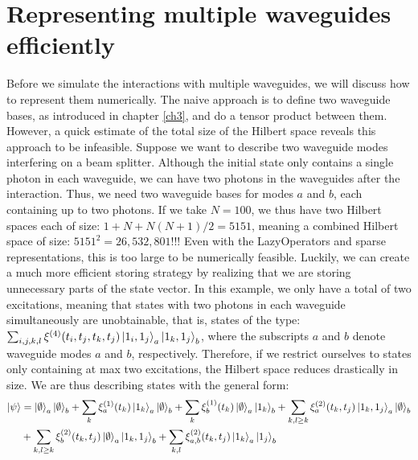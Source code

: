 \section{Representing multiple waveguides efficiently }

Before we simulate the interactions with multiple waveguides, we will discuss how to represent them numerically. The naive approach is to define two waveguide bases, as introduced in chapter \ref{ch3}, and do a tensor product between them. However, a quick estimate of the total size of the Hilbert space reveals this approach to be infeasible. Suppose we want to describe two waveguide modes interfering on a beam splitter. Although the initial state only contains a single photon in each waveguide, we can have two photons in the waveguides after the interaction. Thus, we need two waveguide bases for modes $a$ and $b$, each containing up to two photons. If we take $N=100$, we thus have two Hilbert spaces each of size: $1+N+N(N+1)/2 = 5151$, meaning a combined Hilbert space of size: $5151^2 = 26,532,801$!!! Even with the LazyOperators and sparse representations, this is too large to be numerically feasible. Luckily, we can create a much more efficient storing strategy by realizing that we are storing unnecessary parts of the state vector. In this example, we only have a total of two excitations, meaning that states with two photons in each waveguide simultaneously are unobtainable, that is, states of the type: $\sum_{i,j,k,l}\xi^{(4)}(t_i,t_j,t_k,t_j) \ket{1_i,1_j}_a\ket{1_k,1_j}_b$, where the subscripts $a$ and $b$ denote waveguide modes $a$ and $b$, respectively. Therefore, if we restrict ourselves to states only containing at max two excitations, the Hilbert space reduces drastically in size. We are thus describing states with the general form:
\begin{align}
    \ket{\psi} &= \ket{\emptyset}_a\ket{\emptyset}_b + \sum_k \xi_a^{(1)}(t_k) \ket{1_k}_a\ket{\emptyset}_b + \sum_k \xi_b^{(1)}(t_k) \ket{\emptyset}_a\ket{1_k}_b + \sum_{k,l \geq k}\xi_a^{(2)}(t_k,t_j) \ket{1_k,1_j}_a \ket{\emptyset}_b \\ 
    &+ \sum_{k,l \geq k}\xi_b^{(2)}(t_k,t_j) \ket{\emptyset}_a \ket{1_k,1_j}_b+ \sum_{k,l}\xi_{a,b}^{(2)}(t_k,t_j) \ket{1_k}_a \ket{1_j}_b
\end{align}

